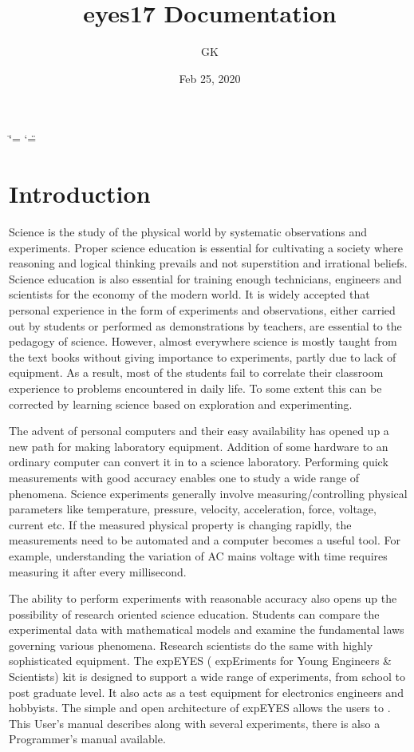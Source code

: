 \documentclass[a4paper,12pt,english]{sphinxmanual}
\title{eyes17 Documentation}
\date{Feb 25, 2020}
\author{GK}
\begin{document}
\ifdefined\shorthandoff
  \ifnum\catcode`\=\string=\active\shorthandoff{=}\fi
  \ifnum\catcode`\"=\active{}\fi
\fi

\pagestyle{empty}


\pagestyle{plain}
\sphinxtableofcontents
\pagestyle{normal}
\label{\detokenize{index::doc}}



\chapter{Introduction}
\label{\detokenize{1.1:introduction}}\label{\detokenize{1.1::doc}}
Science is the study of the physical world by systematic observations
and experiments. Proper science education is essential for cultivating a
society where reasoning and logical thinking prevails and not
superstition and irrational beliefs. Science education is also essential
for training enough technicians, engineers and scientists for the
economy of the modern world. It is widely accepted that personal
experience in the form of experiments and observations, either carried
out by students or performed as demonstrations by teachers, are
essential to the pedagogy of science. However, almost everywhere science
is mostly taught from the text books without giving importance to
experiments, partly due to lack of equipment. As a result, most of the
students fail to correlate their classroom experience to problems
encountered in daily life. To some extent this can be corrected by
learning science based on exploration and experimenting.

The advent of personal computers and their easy availability has opened
up a new path for making laboratory equipment. Addition of some hardware
to an ordinary computer can convert it in to a science laboratory.
Performing quick measurements with good accuracy enables one to study a
wide range of phenomena. Science experiments generally involve
measuring/controlling physical parameters like temperature, pressure,
velocity, acceleration, force, voltage, current etc. If the measured
physical property is changing rapidly, the measurements need to be
automated and a computer becomes a useful tool. For example,
understanding the variation of AC mains voltage with time requires
measuring it after every millisecond.

The ability to perform experiments with reasonable accuracy also opens
up the possibility of research oriented science education. Students can
compare the experimental data with mathematical models and examine the
fundamental laws governing various phenomena. Research scientists do the
same with highly sophisticated equipment. The expEYES ( expEriments for
Young Engineers \& Scientists) kit is designed to support a wide range of
experiments, from school to post graduate level. It also acts as a test
equipment for electronics engineers and hobbyists. The simple and open
architecture of expEYES allows the users to . This User’s manual describes  along with
several experiments, there is also a Programmer’s manual available.
\end{document}
